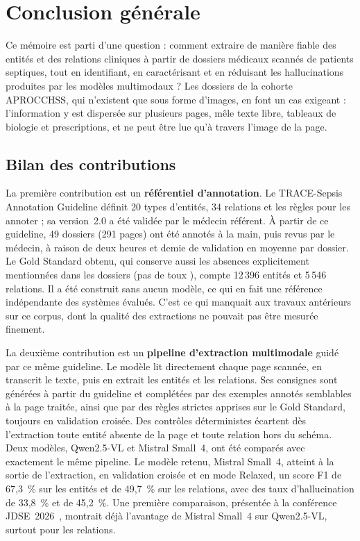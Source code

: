 \chapter*{Conclusion générale}

Ce mémoire est parti d'une question : comment extraire de manière fiable des entités et des relations cliniques à partir de dossiers médicaux scannés de patients septiques, tout en identifiant, en caractérisant et en réduisant les hallucinations produites par les modèles multimodaux ? Les dossiers de la cohorte APROCCHSS, qui n'existent que sous forme d'images, en font un cas exigeant : l'information y est dispersée sur plusieurs pages, mêle texte libre, tableaux de biologie et prescriptions, et ne peut être lue qu'à travers l'image de la page.

\section*{Bilan des contributions}

La première contribution est un \textbf{référentiel d'annotation}. Le TRACE-Sepsis Annotation Guideline définit 20 types d'entités, 34 relations et les règles pour les annoter ; sa version~2.0 a été validée par le médecin référent. À partir de ce guideline, 49 dossiers (291 pages) ont été annotés à la main, puis revus par le médecin, à raison de deux heures et demie de validation en moyenne par dossier. Le Gold Standard obtenu, qui conserve aussi les absences explicitement mentionnées dans les dossiers (\og pas de toux \fg{}), compte 12\,396 entités et 5\,546 relations. Il a été construit sans aucun modèle, ce qui en fait une référence indépendante des systèmes évalués. C'est ce qui manquait aux travaux antérieurs sur ce corpus, dont la qualité des extractions ne pouvait pas être mesurée finement.

La deuxième contribution est un \textbf{pipeline d'extraction multimodale} guidé par ce même guideline. Le modèle lit directement chaque page scannée, en transcrit le texte, puis en extrait les entités et les relations. Ses consignes sont générées à partir du guideline et complétées par des exemples annotés semblables à la page traitée, ainsi que par des règles strictes apprises sur le Gold Standard, toujours en validation croisée. Des contrôles déterministes écartent dès l'extraction toute entité absente de la page et toute relation hors du schéma. Deux modèles, Qwen2.5-VL et Mistral Small~4, ont été comparés avec exactement le même pipeline. Le modèle retenu, Mistral Small~4, atteint à la sortie de l'extraction, en validation croisée et en mode Relaxed, un score F1 de 67,3~\% sur les entités et de 49,7~\% sur les relations, avec des taux d'hallucination de 33,8~\% et de 45,2~\%. Une première comparaison, présentée à la conférence JDSE~2026~\cite{dridi2026jdse}, montrait déjà l'avantage de Mistral Small~4 sur Qwen2.5-VL, surtout pour les relations.

